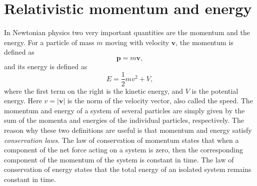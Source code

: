 \documentclass[11pt, a4paper,oneside,openright]{book}
\numberwithin{equation}{section}
\begin{document}
\section{Relativistic momentum and energy}

In Newtonian physics two very important quantities are the momentum and the energy. For a particle of mass $m$ moving with velocity $\mathbf{v}$, the momentum is defined as
\begin{equation}
\mathbf{p}=m\mathbf{v}, 
\end{equation}
and its energy is defined as
\begin{equation}
E=\frac{1}{2}mv^2+V,
\end{equation}
where the first term on the right is the kinetic energy, and $V$ is the potential energy. Here $v=|\mathbf{v}|$ is the norm of the velocity vector, also called the speed. The momentum and energy of a system of several particles are simply given by the sum of the momenta and energies of the individual particles, respectively. The reason why these two definitions are useful is that momentum and energy satisfy {\it conservation laws}. The law of conservation of momentum states that when a component of the net force acting on a system is zero, then the corresponding component of the momentum of the system is constant in time. The law of conservation of energy states that the total energy of an isolated system remains constant in time.
\end{document}
